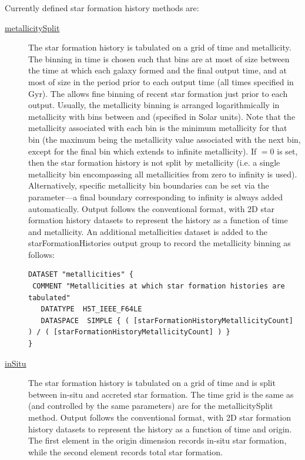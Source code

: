 Currently defined star formation history methods are:
\begin{description}
 \item [\hyperlink{galacticus.output.merger_tree.star_formation.metallicity_split.F90:star_formation_histories_metallicity_split}{{\normalfont \ttfamily metallicitySplit}}] The star formation history is tabulated on a grid of time and metallicity. The binning in time is chosen such that bins are at most of size {\normalfont \ttfamily [starFormationHistoryTimeStep]} between the time at which each galaxy formed and the final output time, and at most of size {\normalfont \ttfamily [starFormationHistoryFineTimeStep]} in the period {\normalfont \ttfamily [starFormationHistoryFineTime]} prior to each output time (all times specified in Gyr). The allows fine binning of recent star formation just prior to each output. Usually, the metallicity binning is arranged logarithmically in metallicity with {\normalfont \ttfamily [starFormationHistoryMetallicityCount]} bins between {\normalfont \ttfamily [starFormationHistoryMetallicityMinimum]} and {\normalfont \ttfamily [starFormationHistoryMetallicityMaximum]} (specified in Solar units). Note that the metallicity associated with each bin is the minimum metallicity for that bin (the maximum being the metallicity value associated with the next bin, except for the final bin which extends to infinite metallicity). If {\normalfont \ttfamily [starFormationHistoryMetallicityCount]}$=0$ is set, then the star formation history is not split by metallicity (i.e. a single metallicity bin encompassing all metallicities from zero to infinity is used). Alternatively, specific metallicity bin boundaries can be set via the {\normalfont \ttfamily [starFormationHistoryMetallicityBoundaries]} parameter---a final boundary corresponding to infinity is always added automatically. Output follows the conventional format, with 2D star formation history datasets to represent the history as a function of time and metallicity. An additional {\normalfont \ttfamily metallicities} dataset is added to the {\normalfont \ttfamily starFormationHistories} output group to record the metallicity binning as follows:
\begin{verbatim}
DATASET "metallicities" {
 COMMENT "Metallicities at which star formation histories are tabulated"
   DATATYPE  H5T_IEEE_F64LE
   DATASPACE  SIMPLE { ( [starFormationHistoryMetallicityCount] ) / ( [starFormationHistoryMetallicityCount] ) }
}
\end{verbatim}
 \item [\hyperlink{galacticus.output.merger_tree.star_formation.in_situ.F90:star_formation_histories_in_situ}{{\normalfont \ttfamily inSitu}}] The star formation history is tabulated on a grid of time and is split between in-situ and accreted star formation. The time grid is the same as (and controlled by the same parameters) are for the {\normalfont \ttfamily metallicitySplit} method. Output follows the conventional format, with 2D star formation history datasets to represent the history as a function of time and origin. The first element in the origin dimension records in-situ star formation, while the second element records total star formation.
\end{description}


